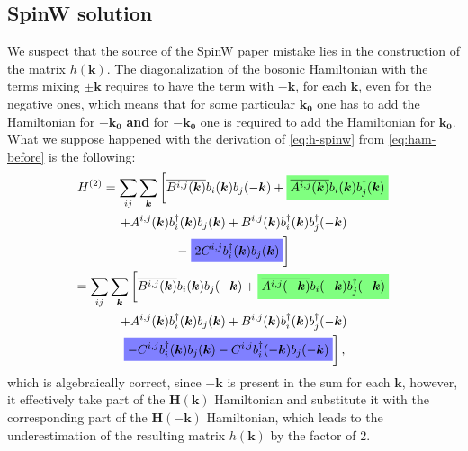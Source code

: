 \documentclass[a4paper,12pt]{article}
\newcommand{\highlightgreen}[1]{%
  \colorbox{green!50}{$\displaystyle#1$}}
\newcommand{\highlightblue}[1]{%
  \colorbox{blue!50}{$\displaystyle#1$}}
\begin{document}
        \subsection{SpinW solution}\label{sec:spinw}

            We suspect that the source of the SpinW paper \cite{toth2015linear} mistake lies in the construction of the matrix $h(\boldsymbol{k})$. 
            The diagonalization of the bosonic Hamiltonian with the terms mixing $\pm\boldsymbol{k}$
            requires to have the term with $-\boldsymbol{k}$, for each $\boldsymbol{k}$, even for the negative ones, 
            which means that for some particular $\boldsymbol{k_0}$ one has to add the Hamiltonian for $-\boldsymbol{k_0}$ \textbf{and} 
            for $-\boldsymbol{k_0}$ one is required to add the Hamiltonian for $\boldsymbol{k_0}$. What we suppose happened with the derivation of \eqref{eq:h-spinw} 
            from \eqref{eq:ham-before} is the following:
            \begin{multline}
                H^{(2)} = \sum_{ij}\sum_{\boldsymbol{k}}\left[\overline{B^{i,j}(\boldsymbol{k})}b_{i}(\boldsymbol{k})b_{j}(-\boldsymbol{k}) +
                \highlightgreen{\overline{A^{i,j}(\boldsymbol{k})}b_{i}(\boldsymbol{k})b^{\dag}_{j}(\boldsymbol{k})}\right. \\+ 
                A^{i,j}(\boldsymbol{k})b^{\dag}_{i}(\boldsymbol{k})b_{j}(\boldsymbol{k}) +
                B^{i,j}(\boldsymbol{k})b^{\dag}_{i}(\boldsymbol{k})b^{\dag}_{j}(-\boldsymbol{k}) \\-
                \left.\highlightblue{2 C^{i,j}b^{\dag}_{i}(\boldsymbol{k})b_{j}(\boldsymbol{k})}\right]\\
                = \sum_{ij}\sum_{\boldsymbol{k}}\left[\overline{B^{i,j}(\boldsymbol{k})}b_{i}(\boldsymbol{k})b_{j}(-\boldsymbol{k}) +
                \highlightgreen{\overline{A^{i,j}(-\boldsymbol{k})}b_{i}(-\boldsymbol{k})b^{\dag}_{j}(-\boldsymbol{k})}\right. \\+ 
                A^{i,j}(\boldsymbol{k})b^{\dag}_{i}(\boldsymbol{k})b_{j}(\boldsymbol{k}) +
                B^{i,j}(\boldsymbol{k})b^{\dag}_{i}(\boldsymbol{k})b^{\dag}_{j}(-\boldsymbol{k}) \\
                \left.\highlightblue{ -C^{i,j}b^{\dag}_{i}(\boldsymbol{k})b_{j}(\boldsymbol{k}) - C^{i,j}b^{\dag}_{i}(-\boldsymbol{k})b_{j}(-\boldsymbol{k})}\right],\\
            \end{multline}
            which is algebraically correct, since $-\boldsymbol{k}$ is present in the sum for each $\boldsymbol{k}$, however, 
            it effectively take part of the $\boldsymbol{H}(\boldsymbol{k})$ Hamiltonian and substitute it with the corresponding part of the $\boldsymbol{H}(-\boldsymbol{k})$ Hamiltonian, 
            which leads to the underestimation of the resulting matrix $h(\boldsymbol{k})$ by the factor of $2$.
\end{document}
